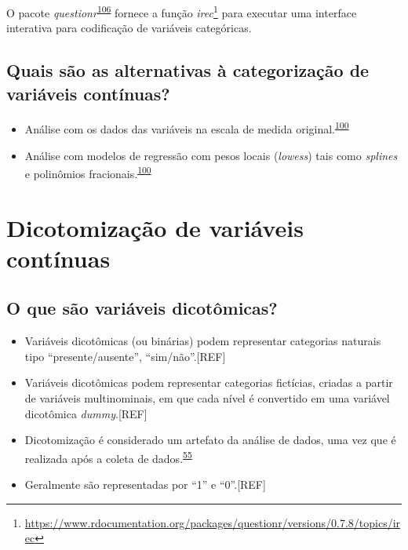 \documentclass[
  a4paper,
]{book}
\renewcommand{\href}[2]{#2\footnote{\url{#1}}}
\newenvironment{infobox}[1]
  {
  \begin{itemize}
  \renewcommand{\labelitemi}{
    \raisebox{-.7\height}[0pt][0pt]{
      {\setkeys{Gin}{width=3em,keepaspectratio}
        \texttt{[image: \#1]}}
    }
  }
  \setlength{\fboxsep}{1em}
  \begin{blackbox}
  \item
  }
  {
  \end{blackbox}
  \end{itemize}
  }
\begin{document}
\begin{infobox}{images/Rlogo}
O pacote \emph{questionr}\textsuperscript{\protect\hyperlink{ref-questionr}{106}} fornece a função \href{https://www.rdocumentation.org/packages/questionr/versions/0.7.8/topics/irec}{\emph{irec}} para executar uma interface interativa para codificação de variáveis categóricas.

\end{infobox}

\hypertarget{quais-suxe3o-as-alternativas-uxe0-categorizauxe7uxe3o-de-variuxe1veis-contuxednuas}{%
\subsection{Quais são as alternativas à categorização de variáveis contínuas?}\label{quais-suxe3o-as-alternativas-uxe0-categorizauxe7uxe3o-de-variuxe1veis-contuxednuas}}

\begin{itemize}
\item
  Análise com os dados das variáveis na escala de medida original.\textsuperscript{\protect\hyperlink{ref-MacCallum2002}{100}}
\item
  Análise com modelos de regressão com pesos locais (\emph{lowess}) tais como \emph{splines} e polinômios fracionais.\textsuperscript{\protect\hyperlink{ref-MacCallum2002}{100}}
\end{itemize}

\hypertarget{dicotomizacao}{%
\section{Dicotomização de variáveis contínuas}\label{dicotomizacao}}

\hypertarget{o-que-suxe3o-variuxe1veis-dicotuxf4micas}{%
\subsection{O que são variáveis dicotômicas?}\label{o-que-suxe3o-variuxe1veis-dicotuxf4micas}}

\begin{itemize}
\item
  Variáveis dicotômicas (ou binárias) podem representar categorias naturais tipo ``presente/ausente'', ``sim/não''.{[}REF{]}
\item
  Variáveis dicotômicas podem representar categorias fictícias, criadas a partir de variáveis multinominais, em que cada nível é convertido em uma variável dicotômica \emph{dummy}.{[}REF{]}
\item
  Dicotomização é considerado um artefato da análise de dados, uma vez que é realizada após a coleta de dados.\textsuperscript{\protect\hyperlink{ref-aguinis2008}{55}}
\item
  Geralmente são representadas por ``1'' e ``0''.{[}REF{]}
\end{itemize}
\end{document}
